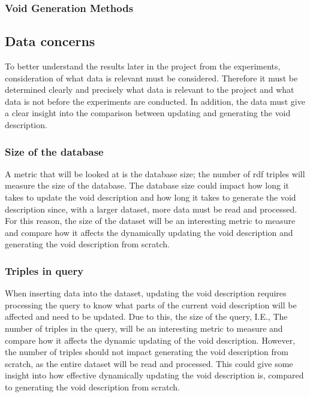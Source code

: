 \subsubsection{Void Generation Methods}\label{sec:voidmethods}


\subsection{Data concerns}\label{sec:concerns}
To better understand the results later in the project from the experiments, consideration of what data is relevant must be considered. Therefore it must be determined clearly and precisely what data is relevant to the project and what data is not before the experiments are conducted. In addition, the data must give a clear insight into the comparison between updating and generating the \gls{void} description.

\subsubsection{Size of the database}
A metric that will be looked at is the database size; the number of \gls{rdf} triples will measure the size of the database. The database size could impact how long it takes to update the \gls{void} description and how long it takes to generate the \gls{void} description since, with a larger dataset, more data must be read and processed. For this reason, the size of the dataset will be an interesting metric to measure and compare how it affects the dynamically updating the \gls{void} description and generating the \gls{void} description from scratch.

\subsubsection{Triples in query}
When inserting data into the dataset, updating the \gls{void} description requires processing the query to know what parts of the current \gls{void} description will be affected and need to be updated. Due to this, the size of the query, I.E., The number of triples in the query, will be an interesting metric to measure and compare how it affects the dynamic updating of the \gls{void} description. However, the number of triples should not impact generating the \gls{void} description from scratch, as the entire dataset will be read and processed. This could give some insight into how effective dynamically updating the \gls{void} description is, compared to generating the \gls{void} description from scratch.

